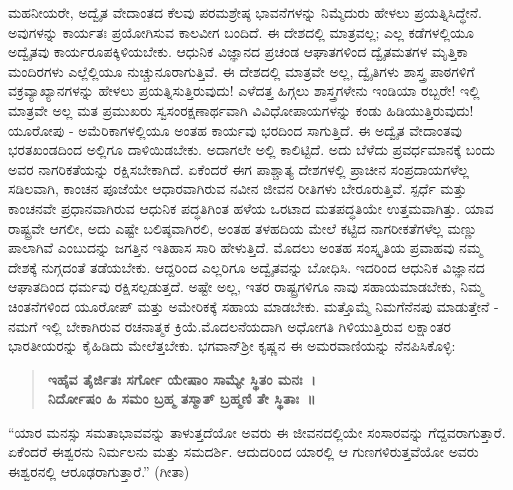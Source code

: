 ಮಹನೀಯರೇ, ಅದ್ವೈತ ವೇದಾಂತದ ಕೆಲವು ಪರಮಶ್ರೇಷ್ಠ ಭಾವನೆಗಳನ್ನು ನಿಮ್ಮೆದುರು ಹೇಳಲು ಪ್ರಯತ್ನಿಸಿದ್ಧೇನೆ. ಅವುಗಳನ್ನು ಕಾರ್ಯತಃ ಪ್ರಯೋಗಿಸುವ ಕಾಲವೀಗ ಬಂದಿದೆ. ಈ ದೇಶದಲ್ಲಿ ಮಾತ್ರವಲ್ಲ; ಎಲ್ಲ ಕಡೆಗಳಲ್ಲಿಯೂ ಅದ್ವೈತವು ಕಾರ್ಯರೂಪಕ್ಕಿಳಿಯಬೇಕು. ಆಧುನಿಕ ವಿಜ್ಞಾನದ ಪ್ರಚಂಡ ಆಘಾತಗಳಿಂದ ದ್ವೈತಮತಗಳ ಮೃತ್ತಿಕಾ ಮಂದಿರಗಳು ಎಲ್ಲೆಲ್ಲಿಯೂ ನುಚ್ಚುನೂರಾಗುತ್ತಿವೆ. ಈ ದೇಶದಲ್ಲಿ ಮಾತ್ರವೇ ಅಲ್ಲ, ದ್ವೈತಿಗಳು ಶಾಸ್ತ್ರ ಪಾಠಗಳಿಗೆ ವಕ್ರವ್ಯಾಖ್ಯಾನಗಳನ್ನು ಹೇಳಲು ಪ್ರಯತ್ನಿಸುತ್ತಿರುವುದು! ಎಳೆದತ್ತ ಹಿಗ್ಗಲು ಶಾಸ್ತ್ರಗಳೇನು ಇಂಡಿಯಾ ರಬ್ಬರೇ! ಇಲ್ಲಿ ಮಾತ್ರವೇ ಅಲ್ಲ ಮತ ಪ್ರಮುಖರು ಸ್ವಸಂರಕ್ಷಣಾರ್ಥವಾಗಿ ವಿವಿಧೋಪಾಯಗಳನ್ನು ಕಂಡು ಹಿಡಿಯುತ್ತಿರುವುದು! ಯೂರೋಪು - ಅಮೆರಿಕಾಗಳಲ್ಲಿಯೂ ಅಂತಹ ಕಾರ್ಯವು ಭರದಿಂದ ಸಾಗುತ್ತಿದೆ. ಈ ಅದ್ವೈತ ವೇದಾಂತವು ಭರತಖಂಡದಿಂದ ಅಲ್ಲಿಗೂ ದಾಳಿಯಿಡಬೇಕು. ಅದಾಗಲೇ ಅಲ್ಲಿ ಕಾಲಿಟ್ಟಿದೆ. ಅದು ಬೆಳೆದು ಪ್ರವರ್ಧಮಾನಕ್ಕೆ ಬಂದು ಅವರ ನಾಗರಿಕತೆಯನ್ನು ರಕ್ಷಿಸಬೇಕಾಗಿದೆ. ಏಕೆಂದರೆ ಈಗ ಪಾಶ್ಚಾತ್ಯ ದೇಶಗಳಲ್ಲಿ ಪ್ರಾಚೀನ ಸಂಪ್ರದಾಯಗಳೆಲ್ಲ ಸಡಿಲವಾಗಿ, ಕಾಂಚನ ಪೂಜೆಯೇ ಆಧಾರವಾಗಿರುವ ನವೀನ ಜೀವನ ರೀತಿಗಳು ಬೇರೂರುತ್ತಿವೆ. ಸ್ಪರ್ಧೆ ಮತ್ತು ಕಾಂಚನವೇ ಪ್ರಧಾನವಾಗಿರುವ ಆಧುನಿಕ ಪದ್ಧತಿಗಿಂತ ಹಳೆಯ ಒರಟಾದ ಮತಪದ್ಧತಿಯೇ ಉತ್ತಮವಾಗಿತ್ತು. ಯಾವ ರಾಷ್ಟ್ರವೇ ಆಗಲೀ, ಅದು ಎಷ್ಟೇ ಬಲಿಷ್ಠವಾಗಿರಲಿ, ಅಂತಹ ತಳಹದಿಯ ಮೇಲೆ ಕಟ್ಟಿದ ನಾಗರೀಕತೆಗಳೆಲ್ಲ ಮಣ್ಣು ಪಾಲಾಗಿವೆ ಎಂಬುದನ್ನು ಜಗತ್ತಿನ ಇತಿಹಾಸ ಸಾರಿ ಹೇಳುತ್ತಿದೆ. ಮೊದಲು ಅಂತಹ ಸಂಸ್ಕೃತಿಯ ಪ್ರವಾಹವು ನಮ್ಮ ದೇಶಕ್ಕೆ ನುಗ್ಗದಂತೆ ತಡೆಯಬೇಕು. ಆದ್ದರಿಂದ ಎಲ್ಲರಿಗೂ ಅದ್ವೈತವನ್ನು ಬೋಧಿಸಿ. ಇದರಿಂದ ಆಧುನಿಕ ವಿಜ್ಞಾನದ ಆಘಾತದಿಂದ ಧರ್ಮವು ರಕ್ಷಿಸಲ್ಪಡುತ್ತದೆ. ಅಷ್ಟೇ ಅಲ್ಲ, ಇತರ ರಾಷ್ಟ್ರಗಳಿಗೂ ನಾವು ಸಹಾಯಮಾಡಬೇಕು, ನಿಮ್ಮ ಚಿಂತನೆಗಳಿಂದ ಯೂರೋಪ್​ ಮತ್ತು ಅಮೇರಿಕಕ್ಕೆ ಸಹಾಯ ಮಾಡಬೇಕು. ಮತ್ತೊಮ್ಮೆ ನಿಮಗೆ\break ನೆನಪು ಮಾಡುತ್ತೇನೆ - ನಮಗೆ ಇಲ್ಲಿ ಬೇಕಾಗಿರುವ ರಚನಾತ್ಮಕ ಕ್ರಿಯೆ.\break ಮೊದಲನೆಯದಾಗಿ ಅಧೋಗತಿ ಗಿಳಿಯುತ್ತಿರುವ ಲಕ್ಷಾಂತರ ಭಾರತೀಯರನ್ನು ಕೈಹಿಡಿದು ಮೇಲೆತ್ತಬೇಕು. ಭಗವಾನ್​ ಶ‍್ರೀ ಕೃಷ್ಣನ ಈ ಅಮರವಾಣಿಯನ್ನು ನೆನಪಿಸಿಕೊಳ್ಳಿ:

\begin{verse}
\textbf{ಇಹೈವ ತೈರ್ಜಿತಃ ಸರ್ಗೋ ಯೇಷಾಂ ಸಾಮ್ಯೇ ಸ್ಥಿತಂ ಮನಃ~।}\\\textbf{ನಿರ್ದೋಷಂ ಹಿ ಸಮಂ ಬ್ರಹ್ಮ ತಸ್ಮಾತ್​ ಬ್ರಹ್ಮಣಿ ತೇ ಸ್ಥಿತಾಃ~॥}
\end{verse}

“ಯಾರ ಮನಸ್ಸು ಸಮತಾಭಾವವನ್ನು ತಾಳುತ್ತದೆಯೋ ಅವರು ಈ ಜೀವನದಲ್ಲಿಯೇ ಸಂಸಾರವನ್ನು ಗೆದ್ದವರಾಗುತ್ತಾರೆ. ಏಕೆಂದರೆ ಈಶ್ವರನು ನಿರ್ಮಲನು ಮತ್ತು ಸಮದರ್ಶಿ. ಆದುದರಿಂದ ಯಾರಲ್ಲಿ ಆ ಗುಣಗಳಿರುತ್ತವೆಯೋ ಅವರು ಈಶ್ವರನಲ್ಲಿ ಆರೂಢರಾಗುತ್ತಾರೆ.” (ಗೀತಾ)

